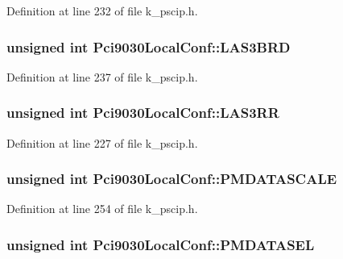 Definition at line 232 of file k\_\-pscip.h.\hypertarget{struct_pci9030_local_conf_87caab5cc668b36e0a311407c43e7eb7}{
\subsubsection[{LAS3BRD}]{\setlength{\rightskip}{0pt plus 5cm}unsigned int {\bf Pci9030LocalConf::LAS3BRD}}}
\label{struct_pci9030_local_conf_87caab5cc668b36e0a311407c43e7eb7}




Definition at line 237 of file k\_\-pscip.h.\hypertarget{struct_pci9030_local_conf_c5aed7b0d70176bee3287582e9b8d3d2}{
\subsubsection[{LAS3RR}]{\setlength{\rightskip}{0pt plus 5cm}unsigned int {\bf Pci9030LocalConf::LAS3RR}}}
\label{struct_pci9030_local_conf_c5aed7b0d70176bee3287582e9b8d3d2}




Definition at line 227 of file k\_\-pscip.h.\hypertarget{struct_pci9030_local_conf_ad5372a8b2e30a778cd6ca906f41aaff}{
\subsubsection[{PMDATASCALE}]{\setlength{\rightskip}{0pt plus 5cm}unsigned int {\bf Pci9030LocalConf::PMDATASCALE}}}
\label{struct_pci9030_local_conf_ad5372a8b2e30a778cd6ca906f41aaff}




Definition at line 254 of file k\_\-pscip.h.\hypertarget{struct_pci9030_local_conf_4fa1a09a088c5d964349d53ff58cc8d5}{
\subsubsection[{PMDATASEL}]{\setlength{\rightskip}{0pt plus 5cm}unsigned int {\bf Pci9030LocalConf::PMDATASEL}}}
\label{struct_pci9030_local_conf_4fa1a09a088c5d964349d53ff58cc8d5}




